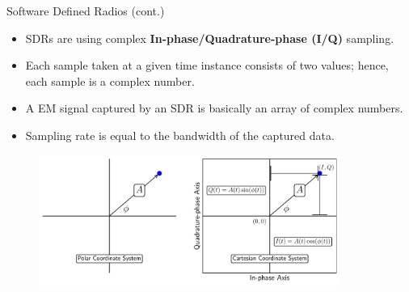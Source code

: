 \documentclass[handout]{beamer}
\begin{document}
\begin{frame}{Software Defined Radios (cont.)}  

	\begin{itemize}
	\footnotesize
	\item SDRs are using complex \textbf{In-phase/Quadrature-phase (I/Q)} sampling.
		\vspace{5pt}
	\item Each sample taken at a given time instance consists of two values; hence, each sample is a complex number.
		\vspace{5pt}
	\item A EM signal captured by an SDR is basically an array of complex numbers.
		\vspace{5pt}
	\item Sampling rate is equal to the bandwidth of the captured data.
	\end{itemize}

	\begin{figure}
		\includegraphics[width=280pt]{figures/iq-representation.pdf}
	\end{figure}

	\footnotesize

\end{frame}
\end{document}
